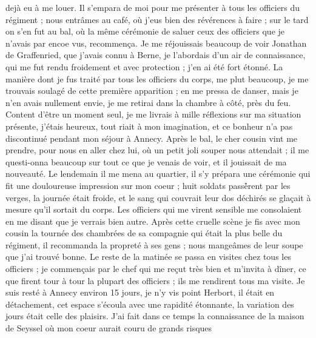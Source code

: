 \documentclass[12pt]{article}
\begin{document}
 dejà eu à me louer. Il s’empara de moi pour me présenter
à tous les officiers du régiment ; nous entrâmes au café, où j’eus bien des révérences à faire ; sur
le tard on s’en fut au bal, où la même cérémonie de saluer ceux des officiers que je n’avais par
encoe vus, recommença. Je me réjouissais beaucoup de voir Jonathan de Graffenried, que j’avais connu
à Berne, je l’abordais d’un air de connaissance, qui me fut rendu froidement et avec protection ;
j’en ai été fort étonné. La manière dont je fus traité par tous les officiers du corps, me plut
beaucoup, je me trouvais soulagé de cette première apparition ; en me pressa de danser, mais je n’en
avais nullement envie, je me retirai dans la chambre à côté, près du feu. Content d’être un moment
seul, je me livrais à mille réflexions sur ma situation présente, j’étais heureux, tout riait à mon
imagination, et ce bonheur n’a pas discontinué pendant mon séjour à Annecy. Après le bal, le cher
cousin vint me prendre, pour nous en aller chez lui, où un petit joli souper nous attendait ; il me
questi-onna beaucoup sur tout ce que je venais de voir, et il jouissait de ma nouveauté. Le
lendemain il me mena au quartier, il s’y prépara une cérémonie qui fit une douloureuse impression
sur mon coeur ; huit soldats passè́rent par les verges, la journée était froide, et le sang qui
couvrait leur dos déchirés se glaçait à mesure qu’il sortait du corps. Les officiers qui me virent
sensible me consolaient en me disant que je verrais bien autre. Après cette cruelle scène je fis
avec mon cousin la tournée des chambrées de sa compagnie qui était la plus belle du régiment, il
recommanda la propreté à ses gens ; nous mangeâmes de leur soupe que j’ai trouvé bonne. Le reste de
la matinée se passa en visites chez tous les officiers ; je commençais par le chef qui me reçut très
bien et m’invita à dîner, ce que firent tour à tour la plupart des officiers ; ils me rendirent tous
ma visite. Je suis resté à Annecy environ 15 jours, je n’y vis point Herbort, il était en
détachement, cet espace s’écoula avec une rapidité étonnante, la variation des jours était celle des
plaisirs. J’ai fait dans ce temps la connaissance de la maison de Seyssel où mon coeur aurait couru
de grands risques
\end{document}
